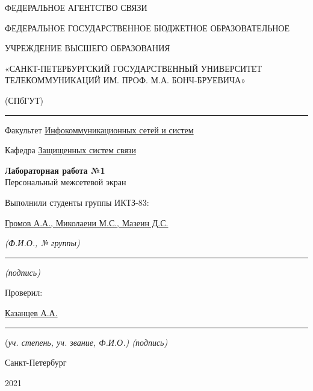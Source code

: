 \documentclass[a4paper,14pt]{extarticle}
\begin{document}
    \begin{center}
        \thispagestyle{empty}
        \begin{singlespace}
        ФЕДЕРАЛЬНОЕ АГЕНТСТВО СВЯЗИ

        ФЕДЕРАЛЬНОЕ ГОСУДАРСТВЕННОЕ БЮДЖЕТНОЕ ОБРАЗОВАТЕЛЬНОЕ

        УЧРЕЖДЕНИЕ ВЫСШЕГО ОБРАЗОВАНИЯ

        «САНКТ-ПЕТЕРБУРГСКИЙ ГОСУДАРСТВЕННЫЙ УНИВЕРСИТЕТ ТЕЛЕКОММУНИКАЦИЙ ИМ. ПРОФ. М.А. БОНЧ-БРУЕВИЧА»

        (СПбГУТ)
        \end{singlespace}
        \vspace{-1ex}
        \rule{\textwidth}{0.4pt}
        \vspace{-5ex}

        Факультет \underline{Инфокоммуникационных сетей и систем}

        Кафедра \underline{Защищенных систем связи}
        \vspace{10ex}

        \textbf{Лабораторная работа №1}\\
        Персональный межсетевой экран
        


    \end{center}
    \vspace{4ex}
    \begin{flushright}
    \parbox{10 cm}{
    \begin{flushleft}
        Выполнили студенты группы ИКТЗ-83:

        \underline{Громов А.А., Миколаени М.С., Мазеин Д.С.} \hfill 

        \footnotesize \textit{ (Ф.И.О., № группы)} \hfill \rule[-0.85ex]{0.1\textwidth}{0.6pt}
        
        \hfill \textit{(подпись)} \normalsize

        Проверил:

        \underline{Казанцев А.А.} \hfill \rule[-0.85ex]{0.1\textwidth}{0.6pt}

        (\footnotesize \textit{уч. степень, уч. звание, Ф.И.О.) \hfill (подпись)} \normalsize

    \end{flushleft}
    }
    \end{flushright}
    \begin{center}
        \vfill
        Санкт-Петербург

        2021

    \end{center}
    \newpage
\end{document}
